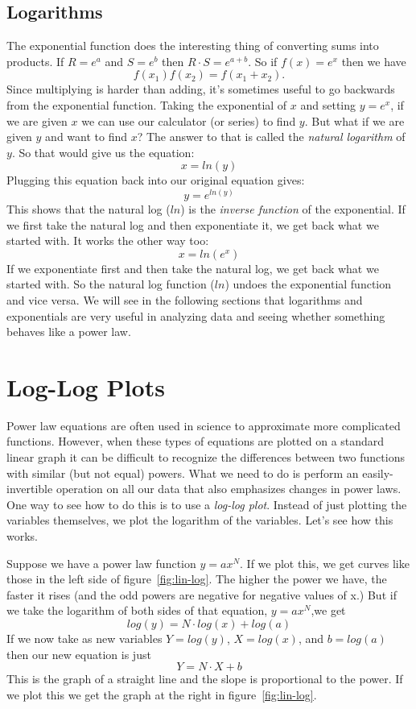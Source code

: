 \subsection*{Logarithms}
The exponential function does the interesting thing of converting sums into products.
If $R = e^{a}$ and $S = e^{b}$ then $R \cdot S = e^{a+b}$.
So if $f(x) = e^{x}$ then we have
\[ f(x_{1})f(x_{2}) = f(x_{1} + x_{2}). \]
Since multiplying is harder than adding, it's sometimes useful to go backwards from the exponential function. 
Taking the exponential of $x$ and setting $y = e^{x}$, if we are given $x$ we can use our calculator (or series) to find $y$.
But what if we are given $y$ and want to find $x$?
The answer to that is called the \emph{natural logarithm} of $y$.
So that would give us the equation:
\[ x = ln(y) \]
Plugging this equation back into our original equation gives:
\[ y = e^{ln(y)} \]
This shows that the natural log ($ln$) is the \emph{inverse function} of the exponential.
If we first take the natural log and then exponentiate it, we get back what we started with.
It works the other way too:
\[ x = ln(e^{x}) \]
If we exponentiate first and then take the natural log, we get back what we started with.
So the natural log function ($ln$) undoes the exponential function and vice versa.
We will see in the following sections that logarithms and exponentials are very useful in analyzing data and seeing whether something behaves like a power law. 

\section{Log-Log Plots}
Power law equations are often used in science to approximate more complicated functions.
However, when these types of equations are plotted on a standard linear graph it can be difficult to recognize the differences between two functions with similar (but not equal) powers.
What we need to do is perform an easily-invertible operation on all our data that also emphasizes changes in power laws. 
One way to see how to do this is to use a \emph{log-log plot}.
Instead of just plotting the variables themselves, we plot the logarithm of the variables.
Let's see how this works.
\par
Suppose we have a power law function $y = ax^{N}$.
If we plot this, we get curves like those in the left side of figure~\ref{fig:lin-log}.
The higher the power we have, the faster it rises (and the odd powers are negative for negative values of x.)
But if we take the logarithm of both sides of that equation, $y = ax^{N}$,we get
\[ log(y)=N \cdot log(x) + log(a) \] 
If we now take as new variables $Y = log(y)$, $X = log(x)$, and $b = log(a)$ then our new equation is just
\[ Y = N \cdot X + b \]
This is the graph of a straight line and the slope is proportional to the power.
If we plot this we get the graph at the right in figure~\ref{fig:lin-log}.

